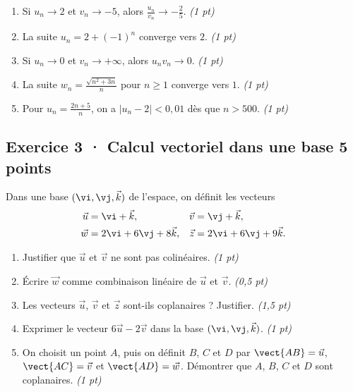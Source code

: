 \begin{enumerate}

\item Si $u_n\to 2$ et $v_n\to-5$, alors $\frac{u_n}{v_n}\to-\frac{2}{5}$. \hfill\textit{(1 pt)}

\item La suite $u_n=2+(-1)^n$ converge vers $2$. \hfill\textit{(1 pt)}

\item Si $u_n\to0$ et $v_n\to+\infty$, alors $u_nv_n\to0$. \hfill\textit{(1 pt)}

\item La suite $w_n=\frac{\sqrt{n^2+3n}}{n}$ pour $n\ge1$ converge vers $1$. \hfill\textit{(1 pt)}

\item Pour $u_n=\frac{2n+5}{n}$, on a $|u_n-2|<0{,}01$ dès que $n> 500$. \hfill\textit{(1 pt)}

\end{enumerate}

\clearpage{}\par

\subsection*{Exercice 3 · Calcul vectoriel dans une base \hfill 5 points}Dans une base $(\vi,\vj,\vec k)$ de l'espace, on définit les vecteurs
\[\begin{aligned}\vec u&=\vi+\vec k,&\vec v&=\vj+\vec k,\\
\vec w&=2\vi+6\vj+8\vec k,&\vec z&=2\vi+6\vj+9\vec k.\end{aligned}\]

\begin{enumerate}

\item Justifier que $\vec u$ et $\vec v$ ne sont pas colinéaires. \hfill\textit{(1 pt)}

\item Écrire $\vec w$ comme combinaison linéaire de $\vec u$ et $\vec v$. \hfill\textit{(0,5 pt)}

\item Les vecteurs $\vec u$, $\vec v$ et $\vec z$ sont-ils coplanaires ? Justifier. \hfill\textit{(1,5 pt)}

\item Exprimer le vecteur $6\vec u-2\vec v$ dans la base $(\vi,\vj,\vec k)$. \hfill\textit{(1 pt)}

\item On choisit un point $A$, puis on définit $B$, $C$ et $D$ par $\vect{AB}=\vec u$, $\vect{AC}=\vec v$ et $\vect{AD}=\vec w$. Démontrer que $A$, $B$, $C$ et $D$ sont coplanaires. \hfill\textit{(1 pt)}

\end{enumerate}

